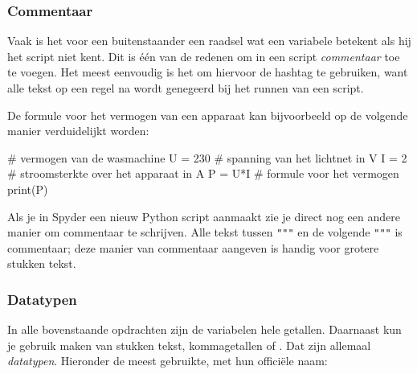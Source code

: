 \documentclass[a4paper,11pt, fleqn]{article}
\begin{document}
\subsubsection{Commentaar}
Vaak is het voor een buitenstaander een raadsel wat een variabele betekent als hij het script niet kent. 
Dit is \'e\'en van de redenen om in een script \textit{commentaar} toe te voegen. 
Het meest eenvoudig is het om hiervoor de hashtag te gebruiken, want alle tekst op een regel na \pythoninline{#} wordt genegeerd bij het runnen van een script. 

De formule voor het vermogen van een apparaat kan bijvoorbeeld op de volgende manier verduidelijkt worden:
\begin{python}
# vermogen van de wasmachine
U = 230	   # spanning van het lichtnet in V
I  = 2     # stroomsterkte over het apparaat in A
P = U*I    # formule voor het vermogen
print(P)
\end{python}

Als je in Spyder een nieuw Python script aanmaakt zie je direct nog een andere manier om commentaar te schrijven. Alle tekst tussen \verb,""", en de volgende \verb,""", is commentaar; deze manier van commentaar aangeven is handig voor grotere stukken tekst. 

\subsubsection{Datatypen}
In alle bovenstaande opdrachten zijn de variabelen hele getallen. Daarnaast kun je gebruik maken van stukken tekst, kommagetallen of . Dat zijn allemaal {\it datatypen}. Hieronder de meest gebruikte, met hun offici\"ele naam:
\end{document}
